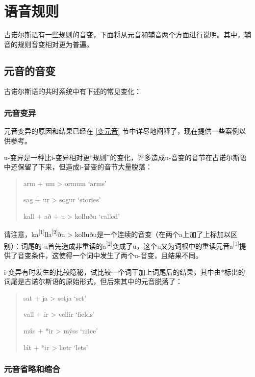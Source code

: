 \section{语音规则}
\label{语音规则}

古诺尔斯语有一些规则的音变，下面将从元音和辅音两个方面进行说明。其中，辅音的规则音变相对更为普遍。

\subsection{元音的音变}
\label{元音的音变}

古诺尔斯语的共时系统中有下述的常见变化：
\subsubsection{元音变异}
\label{元音变异}


元音变异的原因和结果已经在 \ref{变元音} 节中详尽地阐释了，现在提供一些案例以供参考。

u-变异是一种比i-变异相对更``规则''的变化，许多造成u-音变的音节在古诺尔斯语中还保留了下来，但造成i-音变的音节大量脱落：

\begin{quote}
  arm + um > ormum `arms'

  sag + ur > sogur `stories'

  kall + að + u > kolluðu `called'
\end{quote}

请注意，ka\textsuperscript{[1]}lla\textsuperscript{[2]}ðu > kolluðu是一个连续的音变（在两个a上加了上标加以区别）：词尾的-u首先造成非重读的a\textsuperscript{[2]}变成了u，这个u又为词根中的重读元音a\textsuperscript{[1]}提供了音变条件，这使得一个词中发生了两个u-音变，且结果不同。

i-变异有时发生的比较隐秘，试比较一个词干加上词尾后的结果，其中由*标出的词尾是古诺尔斯语的原始形式，但后来其中的元音脱落了：

\begin{quote}
  sat + ja > setja `set'

  vall + ir > vellir `fields'

  mús + *ir > mýss `mice'

  lát + *ir > lætr `lets'
\end{quote}


\subsubsection{元音省略和缩合}
\label{元音省略和缩合}

